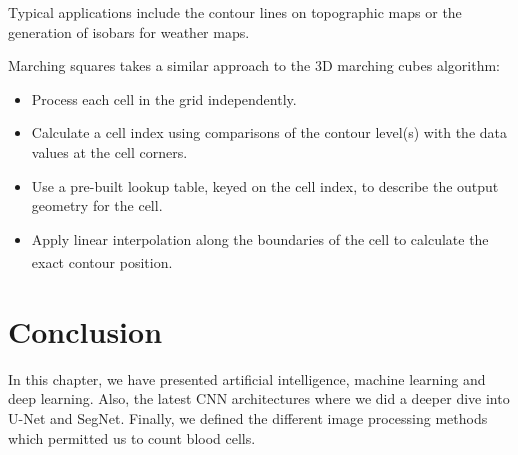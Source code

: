 Typical applications include the contour lines on topographic maps or the generation of isobars for weather maps.

Marching squares takes a similar approach to the 3D marching cubes algorithm:

\begin{itemize}
    \item Process each cell in the grid independently.
    \item Calculate a cell index using comparisons of the contour level(s) with the data values at the cell corners.
    \item Use a pre-built lookup table, keyed on the cell index, to describe the output geometry for the cell.
    \item Apply linear interpolation along the boundaries of the cell to calculate the exact contour position. \textsuperscript{\cite{maple2003geometric}}
\end{itemize}

\section{Conclusion}
In this chapter, we have presented artificial intelligence, machine learning and deep learning. Also, the latest CNN architectures where we did a deeper dive into U-Net and SegNet.
Finally, we defined the different image processing methods which permitted us to count blood cells.

\newpage
